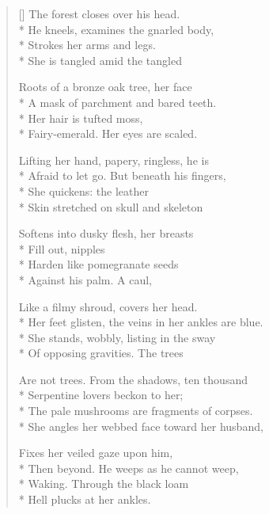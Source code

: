 \label{ch:divorce}
\settowidth{\versewidth}{Her feet glisten, the veins in her ankles are blue.}
\begin{verse}[\versewidth]
The forest closes over his head.\\*
He kneels, examines the gnarled body, \\*
Strokes her arms and legs.\\*
She is tangled amid the tangled

Roots of a bronze oak tree, her face\\*
A mask of parchment and bared teeth.\\*
Her hair is tufted moss,\\*
Fairy-emerald. Her eyes are scaled.

Lifting her hand, papery, ringless, he is \\*
Afraid to let go.  But beneath his fingers,\\*
She quickens: the leather \\*
Skin stretched on skull and skeleton

Softens into dusky flesh, her breasts\\*
Fill out, nipples\\*
Harden like pomegranate seeds\\*
Against his palm.  A caul,

Like a filmy shroud, covers her head.\\*
Her feet glisten, the veins in her ankles are blue.\\*
She stands, wobbly, listing in the sway\\*
Of opposing gravities.  The trees

Are not trees.  From the shadows, ten thousand\\*
Serpentine lovers beckon to her;\\*
The pale mushrooms are fragments of corpses.\\*
She angles her webbed face toward her husband,

Fixes her veiled gaze upon him,\\*
Then beyond.  He weeps as he cannot weep,\\*
Waking.  Through the black loam\\*
Hell plucks at her ankles.
\end{verse}
